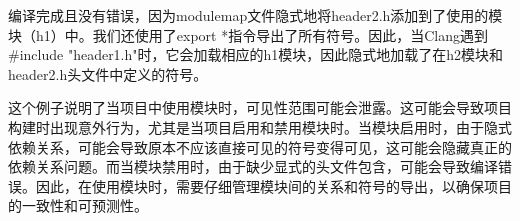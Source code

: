 编译完成且没有错误，因为modulemap文件隐式地将header2.h添加到了使用的模块（h1）中。我们还使用了export *指令导出了所有符号。因此，当Clang遇到\#include "header1.h"时，它会加载相应的h1模块，因此隐式地加载了在h2模块和header2.h头文件中定义的符号。

这个例子说明了当项目中使用模块时，可见性范围可能会泄露。这可能会导致项目构建时出现意外行为，尤其是当项目启用和禁用模块时。当模块启用时，由于隐式依赖关系，可能会导致原本不应该直接可见的符号变得可见，这可能会隐藏真正的依赖关系问题。而当模块禁用时，由于缺少显式的头文件包含，可能会导致编译错误。因此，在使用模块时，需要仔细管理模块间的关系和符号的导出，以确保项目的一致性和可预测性。










